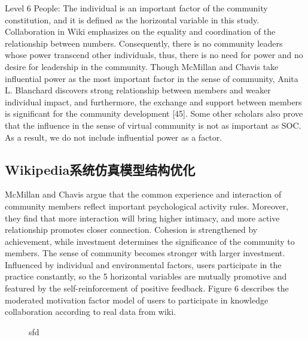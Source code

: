 \documentclass{elsarticle}
\begin{document}
Level 6 People: The individual is an important factor of the community constitution, and it is defined as the horizontal variable in this study. 
Collaboration in Wiki emphasizes on the equality and coordination of
the relationship between numbers. Consequently, there is no community
leaders whose power transcend other individuals, thus, there is no
need for power and no desire for leadership in the community. Though
McMillan and Chavis take influential power as the most important
factor in the sense of community, Anita L. Blanchard discovers strong
relationship between members and weaker individual impact, and
furthermore, the exchange and support between members is significant
for the community development [45]. Some other scholars also prove
that the influence in the sense of virtual community is not as
important as SOC. As a result, we do not include influential power as
a factor. 

\subsection{Wikipedia系统仿真模型结构优化}
\label{sec:wikipedia}

McMillan and Chavis argue that the common experience and interaction
of community members reflect important psychological activity
rules. Moreover, they find that more interaction will bring higher
intimacy, and more active relationship promotes closer
connection. Cohesion is strengthened by achievement, while investment
determines the significance of the community to members. The sense of
community becomes stronger with larger investment. Influenced by
individual and environmental factors, users participate in the
practice constantly, so the 5 horizontal variables are mutually
promotive and featured by the self-reinforcement of positive
feedback. Figure 6 describes the moderated motivation factor model of
users to participate in knowledge collaboration according to real data
from wiki.

\begin{figure}[htpb]
  \centering
  \caption{sfd}
\end{figure}
\end{document}

